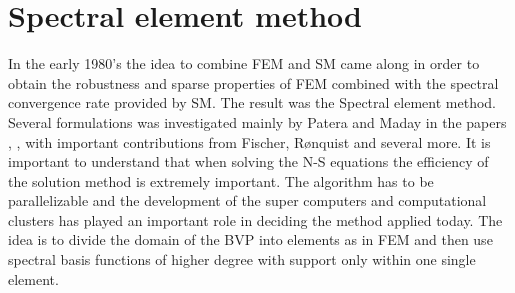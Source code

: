 
\section{Spectral element method}
In the early 1980's the idea to combine FEM and SM came along in order to obtain the 
robustness and sparse properties of FEM 
combined with the spectral convergence rate provided by SM. 
The result was the Spectral element method. Several formulations was investigated mainly by 
Patera and Maday in the papers \cite{maday1989}, \cite{Patera1984}, \cite{Patera1986} with 
important contributions from Fischer, Rønquist and several more.
It is important to understand that when solving the N-S equations the efficiency of the solution 
method is extremely important. The algorithm has to be parallelizable and the development of the
super computers and computational clusters has played an important role in 
deciding the method applied today. 
The idea is to divide the domain of the BVP into elements as in FEM and then use spectral basis 
functions of higher degree with support only within one single element. 


